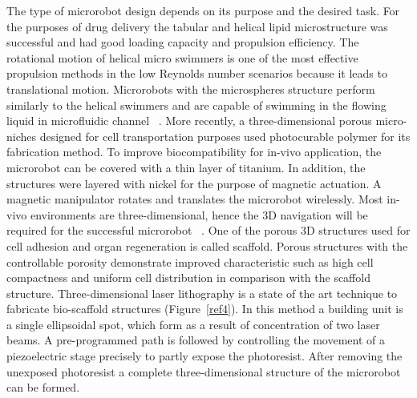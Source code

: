 \documentclass[a4paper,11pt]{article}
\begin{document}
\begin{sloppypar}


The type of microrobot design depends on its purpose and the desired task.
 For the purposes of drug delivery the tabular and helical lipid microstructure was successful
 and had good loading capacity and propulsion efficiency. The rotational motion of helical micro
 swimmers is one of the most effective propulsion methods in the low Reynolds number scenarios 
because it leads to translational motion. Microrobots with the microspheres structure perform similarly 
to the helical swimmers and are capable of swimming in the flowing liquid in microfluidic channel ~\citep{kim2013fabrication}. 
More recently, a three-dimensional porous micro-niches designed for cell transportation purposes used
 photocurable polymer for its fabrication method. To improve biocompatibility for in-vivo application, the 
microrobot can be covered with a thin layer of titanium. In addition, the structures were layered with 
nickel for the purpose of magnetic actuation. A magnetic manipulator rotates and translates the 
microrobot wirelessly. Most in-vivo environments are three-dimensional, hence the 3D navigation will be 
required for the successful microrobot ~\citep{kim2013fabrication}.
One of the porous 3D structures used for cell adhesion and organ regeneration is called scaffold. 
Porous structures with the controllable porosity demonstrate improved characteristic such as high cell 
compactness and uniform cell distribution in comparison with the scaffold structure. Three-dimensional 
laser lithography is a state of the art technique to fabricate bio-scaffold structures (Figure~\ref{ref4}). In this method a building unit is a 
single ellipsoidal spot, which form as a result of concentration of two laser beams. A pre-programmed path 
is followed by controlling the movement of a piezoelectric stage precisely to partly expose the photoresist.
 After removing the unexposed photoresist a complete three-dimensional structure of the microrobot can 
be formed.   


\end{sloppypar}
\end{document}
